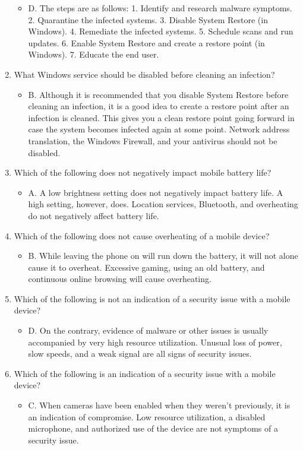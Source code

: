 \documentclass{article}
\begin{document}
\begin{enumerate}
\begin{itemize}
        \item D. The steps are as follows:
1. Identify and research malware symptoms.
2. Quarantine the infected systems.
3. Disable System Restore (in Windows).
4. Remediate the infected systems.
5. Schedule scans and run updates.
6. Enable System Restore and create a restore point (in Windows).
7. Educate the end user.
    \end{itemize}
    \item What Windows service should be disabled before cleaning an infection?
    \begin{itemize}
        \item B. Although it is recommended that you disable System Restore before cleaning an
infection, it is a good idea to create a restore point after an infection is cleaned. This gives
you a clean restore point going forward in case the system becomes infected again at some
point. Network address translation, the Windows Firewall, and your antivirus should not
be disabled.
    \end{itemize}
    \item Which of the following does not negatively impact mobile battery life?
    \begin{itemize}
        \item A. A low brightness setting does not negatively impact battery life. A high setting, however,
does. Location services, Bluetooth, and overheating do not negatively affect battery life.
    \end{itemize}
    \item Which of the following does not cause overheating of a mobile device?
    \begin{itemize}
        \item B. While leaving the phone on will run down the battery, it will not alone cause it to
overheat. Excessive gaming, using an old battery, and continuous online browsing will
cause overheating.
    \end{itemize}
    \item Which of the following is not an indication of a security issue with a mobile device?
    \begin{itemize}
        \item D. On the contrary, evidence of malware or other issues is usually accompanied by very
high resource utilization. Unusual loss of power, slow speeds, and a weak signal are all
signs of security issues.
    \end{itemize}
    \item Which of the following is an indication of a security issue with a mobile device?
    \begin{itemize}
        \item C. When cameras have been enabled when they weren’t previously, it is an indication of
compromise. Low resource utilization, a disabled microphone, and authorized use of the
device are not symptoms of a security issue.
    \end{itemize}
\end{enumerate}
\end{document}
